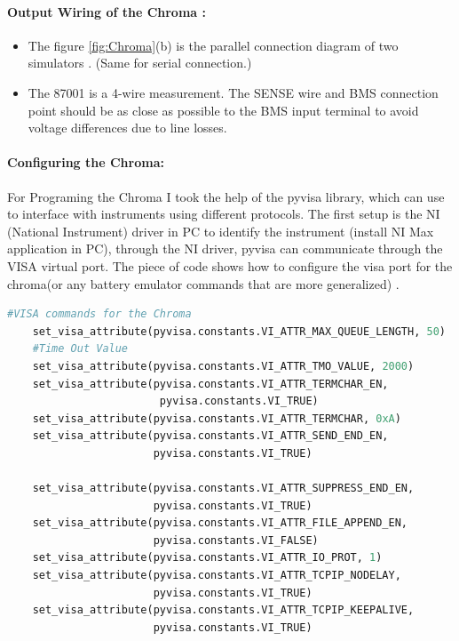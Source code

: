 \paragraph{Output Wiring of the Chroma :}

\begin{itemize}
    \item The figure \ref{fig:Chroma}(b) is the parallel connection diagram of two simulators \cite{Chroma_UserManual}. (Same for serial connection.)
    \item The 87001 is a 4-wire measurement. The SENSE wire and BMS connection point should be as close as possible to the BMS input terminal to avoid voltage differences due to line losses.
\end{itemize}

\paragraph{Configuring the Chroma:}

For Programing the Chroma I took the help of the pyvisa library, which can use to interface with instruments using different protocols. The first setup is the NI (National Instrument) driver in PC to identify the instrument (install NI Max application in PC), through the NI driver, pyvisa can communicate through the VISA virtual port. The piece of code shows how to configure the visa port for the chroma(or any battery emulator commands that are more generalized) \cite{Chroma_UserManual}.

% 
\begin{lstlisting}[language=Python, caption=VISA parameters set for Chroma]
    #VISA commands for the Chroma
    set_visa_attribute(pyvisa.constants.VI_ATTR_MAX_QUEUE_LENGTH, 50)
    #Time Out Value 
    set_visa_attribute(pyvisa.constants.VI_ATTR_TMO_VALUE, 2000) 
    set_visa_attribute(pyvisa.constants.VI_ATTR_TERMCHAR_EN, 
                        pyvisa.constants.VI_TRUE)
    set_visa_attribute(pyvisa.constants.VI_ATTR_TERMCHAR, 0xA) 
    set_visa_attribute(pyvisa.constants.VI_ATTR_SEND_END_EN, 
                       pyvisa.constants.VI_TRUE) 
    
    set_visa_attribute(pyvisa.constants.VI_ATTR_SUPPRESS_END_EN, 
                       pyvisa.constants.VI_TRUE)
    set_visa_attribute(pyvisa.constants.VI_ATTR_FILE_APPEND_EN, 
                       pyvisa.constants.VI_FALSE) 
    set_visa_attribute(pyvisa.constants.VI_ATTR_IO_PROT, 1) 
    set_visa_attribute(pyvisa.constants.VI_ATTR_TCPIP_NODELAY, 
                       pyvisa.constants.VI_TRUE) 
    set_visa_attribute(pyvisa.constants.VI_ATTR_TCPIP_KEEPALIVE, 
                       pyvisa.constants.VI_TRUE)
\end{lstlisting}


